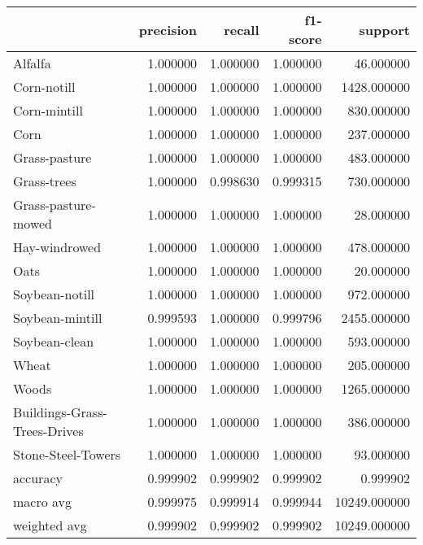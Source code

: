 \begin{tabular}{lrrrr}
\toprule
{} &  precision &    recall &  f1-score &       support \\
\midrule
Alfalfa                      &   1.000000 &  1.000000 &  1.000000 &     46.000000 \\
Corn-notill                  &   1.000000 &  1.000000 &  1.000000 &   1428.000000 \\
Corn-mintill                 &   1.000000 &  1.000000 &  1.000000 &    830.000000 \\
Corn                         &   1.000000 &  1.000000 &  1.000000 &    237.000000 \\
Grass-pasture                &   1.000000 &  1.000000 &  1.000000 &    483.000000 \\
Grass-trees                  &   1.000000 &  0.998630 &  0.999315 &    730.000000 \\
Grass-pasture-mowed          &   1.000000 &  1.000000 &  1.000000 &     28.000000 \\
Hay-windrowed                &   1.000000 &  1.000000 &  1.000000 &    478.000000 \\
Oats                         &   1.000000 &  1.000000 &  1.000000 &     20.000000 \\
Soybean-notill               &   1.000000 &  1.000000 &  1.000000 &    972.000000 \\
Soybean-mintill              &   0.999593 &  1.000000 &  0.999796 &   2455.000000 \\
Soybean-clean                &   1.000000 &  1.000000 &  1.000000 &    593.000000 \\
Wheat                        &   1.000000 &  1.000000 &  1.000000 &    205.000000 \\
Woods                        &   1.000000 &  1.000000 &  1.000000 &   1265.000000 \\
Buildings-Grass-Trees-Drives &   1.000000 &  1.000000 &  1.000000 &    386.000000 \\
Stone-Steel-Towers           &   1.000000 &  1.000000 &  1.000000 &     93.000000 \\
accuracy                     &   0.999902 &  0.999902 &  0.999902 &      0.999902 \\
macro avg                    &   0.999975 &  0.999914 &  0.999944 &  10249.000000 \\
weighted avg                 &   0.999902 &  0.999902 &  0.999902 &  10249.000000 \\
\bottomrule
\end{tabular}
